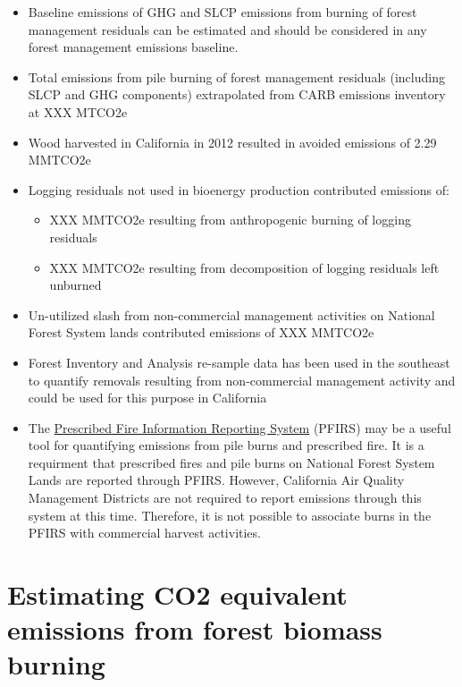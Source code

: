 \documentclass[a4paper]{article}
\begin{document}
\begin{itemize}
\item Baseline emissions of GHG and SLCP emissions from burning of forest
management residuals can be estimated and should be considered in
any forest management emissions baseline.

\item Total emissions from pile burning of forest management residuals
(including SLCP and GHG components) extrapolated from CARB emissions
inventory at XXX MTCO2e

\item Wood harvested in California in 2012 resulted in avoided emissions of
2.29 MMTCO2e

\item Logging residuals not used in bioenergy production contributed
emissions of:
\begin{itemize}
\item XXX MMTCO2e resulting from anthropogenic burning of logging residuals

\item XXX MMTCO2e resulting from decomposition of logging residuals left
unburned
\end{itemize}

\item Un-utilized slash from non-commercial management activities on
National Forest System lands contributed emissions of XXX MMTCO2e

\item Forest Inventory and Analysis re-sample data has been used in the
southeast to quantify removals resulting from non-commercial
management activity and could be used for this purpose in California

\item The \href{https://ssl.arb.ca.gov/pfirs/}{Prescribed Fire Information Reporting System} (PFIRS) may be a useful tool for quantifying
emissions from pile burns and prescribed fire. It is a requirment that prescribed fires and pile
burns on National Forest System Lands are reported through PFIRS. However, California Air Quality Management
Districts are not required to report emissions through this system at this time. Therefore, it is not possible to associate burns in the PFIRS with commercial harvest activities.
\end{itemize}

\section{Estimating CO2 equivalent emissions from forest biomass burning}
\label{sec-2}
\end{document}
